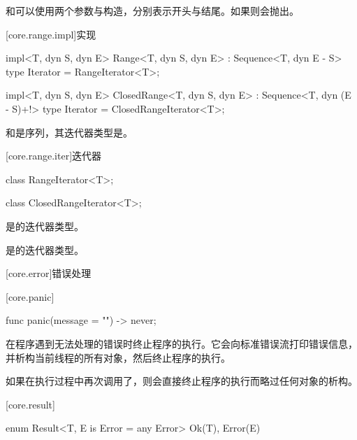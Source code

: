 \pnum
{}和可以使用两个参数与构造，分别表示开头与结尾。如果则会抛出。

[core.range.impl]{实现}

\begin{itemdecl}
impl<T, dyn S, dyn E> Range<T, dyn S, dyn E> : Sequence<T, dyn E - S> {
    type Iterator = RangeIterator<T>;
}
\end{itemdecl}

\begin{itemdecl}
impl<T, dyn S, dyn E> ClosedRange<T, dyn S, dyn E> : Sequence<T, dyn (E - S)+!> {
    type Iterator = ClosedRangeIterator<T>;
}
\end{itemdecl}

\pnum
{}和是序列，其迭代器类型是。

[core.range.iter]{迭代器}

\begin{itemdecl}
class RangeIterator<T>;
\end{itemdecl}

\begin{itemdecl}
class ClosedRangeIterator<T>;
\end{itemdecl}

\pnum
{}是的迭代器类型。

\pnum
{}是的迭代器类型。

[core.error]{错误处理}

[core.panic]{}

\begin{itemdecl}
func panic(message = "") -> never;
\end{itemdecl}

\pnum
{}在程序遇到无法处理的错误时终止程序的执行。它会向标准错误流打印错误信息，并析构当前线程的所有对象，然后终止程序的执行。

\pnum
如果在执行过程中再次调用了，则会直接终止程序的执行而略过任何对象的析构。

[core.result]{}

\begin{itemdecl}
enum Result<T, E is Error = any Error> {
    Ok(T),
    Error(E)
}
\end{itemdecl}

